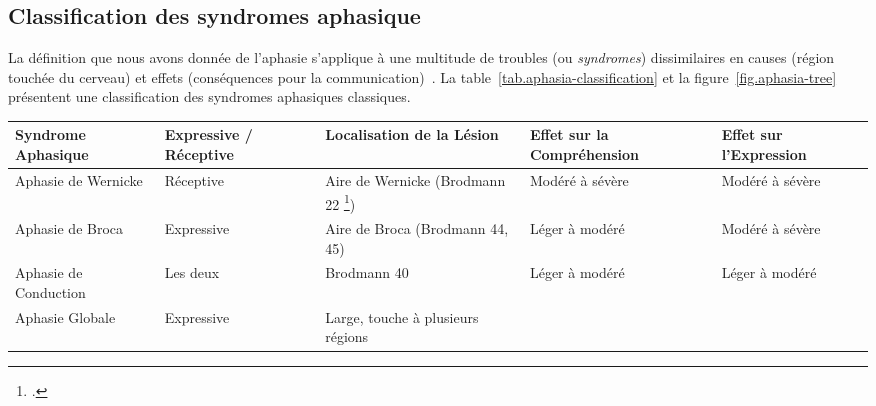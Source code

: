 \subsection{Classification des syndromes aphasique}

La définition que nous avons donnée de l'aphasie s'applique à une multitude de troubles
(ou \emph{syndromes}) dissimilaires en causes (région touchée du cerveau) 
et effets (conséquences pour la communication)~\cite{Hallowell_2017}.
La table~\ref{tab.aphasia-classification} 
et la figure~\ref{fig.aphasia-tree}
présentent une classification des syndromes aphasiques classiques.
\begin{table}[ht]
    \centering
    \begin{adjustbox}{max width=15cm}
        \begin{tabular}{|p{3cm}|p{3cm}|p{3cm}|p{3cm}|p{3cm}|}
        \hline
        Syndrome Aphasique                                      & 
        Expressive / Réceptive                                  & 
        Localisation de la Lésion                               & 
        Effet sur la Compréhension                              & 
        Effet sur l'Expression                                  \\
        \hline
        Aphasie de Wernicke                                     & 
        Réceptive                                               & 
        Aire de Wernicke (Brodmann 22 \footcite{Brodmann_2007}) &
        Modéré à sévère                                         & 
        Modéré à sévère                                         \\
        \hline
        Aphasie de Broca                                        &
        Expressive                                              &
        Aire de Broca (Brodmann 44, 45)                         &
        Léger à modéré                                          &
        Modéré à sévère                                         \\
        \hline
        Aphasie de Conduction                                   &
        Les deux                                                &
        Brodmann 40                                             &
        Léger à modéré                                          &
        Léger à modéré                                          \\
        \hline
        Aphasie Globale                                         &
        Expressive                                              &
        Large, touche à plusieurs régions                       &

\end{tabular}
\end{adjustbox}
\end{table}
